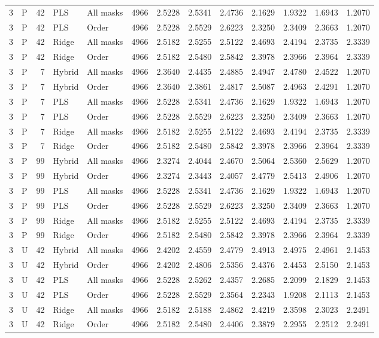 \documentclass[10pt,a4paper]{article}
\begin{document}
\begin{landscape}
\begin{longtable}{rlrllrrrrrrrr}
3 & P & 42 & PLS & All masks & 4966 & 2.5228 & 2.5341 & 2.4736 & 2.1629 & 1.9322 & 1.6943 & 1.2070 \\
3 & P & 42 & PLS & Order & 4966 & 2.5228 & 2.5529 & 2.6223 & 2.3250 & 2.3409 & 2.3663 & 1.2070 \\
3 & P & 42 & Ridge & All masks & 4966 & 2.5182 & 2.5255 & 2.5122 & 2.4693 & 2.4194 & 2.3735 & 2.3339 \\
3 & P & 42 & Ridge & Order & 4966 & 2.5182 & 2.5480 & 2.5842 & 2.3978 & 2.3966 & 2.3964 & 2.3339 \\
3 & P & 7 & Hybrid & All masks & 4966 & 2.3640 & 2.4435 & 2.4885 & 2.4947 & 2.4780 & 2.4522 & 1.2070 \\
3 & P & 7 & Hybrid & Order & 4966 & 2.3640 & 2.3861 & 2.4817 & 2.5087 & 2.4963 & 2.4291 & 1.2070 \\
3 & P & 7 & PLS & All masks & 4966 & 2.5228 & 2.5341 & 2.4736 & 2.1629 & 1.9322 & 1.6943 & 1.2070 \\
3 & P & 7 & PLS & Order & 4966 & 2.5228 & 2.5529 & 2.6223 & 2.3250 & 2.3409 & 2.3663 & 1.2070 \\
3 & P & 7 & Ridge & All masks & 4966 & 2.5182 & 2.5255 & 2.5122 & 2.4693 & 2.4194 & 2.3735 & 2.3339 \\
3 & P & 7 & Ridge & Order & 4966 & 2.5182 & 2.5480 & 2.5842 & 2.3978 & 2.3966 & 2.3964 & 2.3339 \\
3 & P & 99 & Hybrid & All masks & 4966 & 2.3274 & 2.4044 & 2.4670 & 2.5064 & 2.5360 & 2.5629 & 1.2070 \\
3 & P & 99 & Hybrid & Order & 4966 & 2.3274 & 2.3443 & 2.4057 & 2.4779 & 2.5413 & 2.4906 & 1.2070 \\
3 & P & 99 & PLS & All masks & 4966 & 2.5228 & 2.5341 & 2.4736 & 2.1629 & 1.9322 & 1.6943 & 1.2070 \\
3 & P & 99 & PLS & Order & 4966 & 2.5228 & 2.5529 & 2.6223 & 2.3250 & 2.3409 & 2.3663 & 1.2070 \\
3 & P & 99 & Ridge & All masks & 4966 & 2.5182 & 2.5255 & 2.5122 & 2.4693 & 2.4194 & 2.3735 & 2.3339 \\
3 & P & 99 & Ridge & Order & 4966 & 2.5182 & 2.5480 & 2.5842 & 2.3978 & 2.3966 & 2.3964 & 2.3339 \\
3 & U & 42 & Hybrid & All masks & 4966 & 2.4202 & 2.4559 & 2.4779 & 2.4913 & 2.4975 & 2.4961 & 2.1453 \\
3 & U & 42 & Hybrid & Order & 4966 & 2.4202 & 2.4806 & 2.5356 & 2.4376 & 2.4453 & 2.5150 & 2.1453 \\
3 & U & 42 & PLS & All masks & 4966 & 2.5228 & 2.5262 & 2.4357 & 2.2685 & 2.2099 & 2.1829 & 2.1453 \\
3 & U & 42 & PLS & Order & 4966 & 2.5228 & 2.5529 & 2.3564 & 2.2343 & 1.9208 & 2.1113 & 2.1453 \\
3 & U & 42 & Ridge & All masks & 4966 & 2.5182 & 2.5188 & 2.4862 & 2.4219 & 2.3598 & 2.3023 & 2.2491 \\
3 & U & 42 & Ridge & Order & 4966 & 2.5182 & 2.5480 & 2.4406 & 2.3879 & 2.2955 & 2.2512 & 2.2491 \\
\end{longtable}
\endgroup
\end{landscape}
\end{document}
